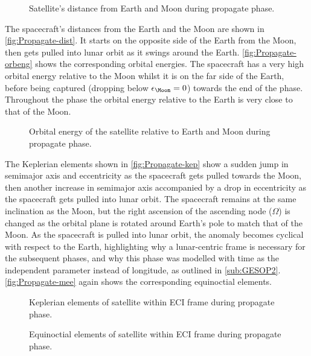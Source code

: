 \begin{figure}
\centering
\def\svgwidth{\figurewidth}

\caption{Satellite's distance from Earth and Moon during propagate phase.} \label{fig:Propagate-dist}
\end{figure}

The spacecraft's distances from the Earth and the Moon are shown in \autoref{fig:Propagate-dist}. It starts on the opposite side of the Earth from the Moon, then gets pulled into lunar orbit as it swings around the Earth. \autoref{fig:Propagate-orbeng} shows the corresponding orbital energies. The spacecraft has a very high orbital energy relative to the Moon whilst it is on the far side of the Earth, before being captured (dropping below $\epsilon_\Moon=0$) towards the end of the phase. Throughout the phase the orbital energy relative to the Earth is very close to that of the Moon.

\begin{figure}
\centering
\def\svgwidth{\figurewidth}

\caption{Orbital energy of the satellite relative to Earth and Moon during propagate phase.} \label{fig:Propagate-orbeng}
\end{figure}

The Keplerian elements shown in \autoref{fig:Propagate-kep} show a sudden jump in semimajor axis and eccentricity as the spacecraft gets pulled towards the Moon, then another increase in semimajor axis accompanied by a drop in eccentricity as the spacecraft gets pulled into lunar orbit. The spacecraft remains at the same inclination as the Moon, but the right ascension of the ascending node ($\Omega$) is changed as the orbital plane is rotated around Earth's pole to match that of the Moon. As the spacecraft is pulled into lunar orbit, the anomaly becomes cyclical with respect to the Earth, highlighting why a lunar-centric frame is necessary for the subsequent phases, and why this phase was modelled with time as the independent parameter instead of longitude, as outlined in \autoref{sub:GESOP2}. \autoref{fig:Propagate-mee} again shows the corresponding equinoctial elements.

\begin{figure}
\centering
\def\svgwidth{0.8\textwidth}

\caption{Keplerian elements of satellite within ECI frame during propagate phase.} \label{fig:Propagate-kep}
\end{figure}

\begin{figure}
\centering
\def\svgwidth{\figurewidth}

\caption{Equinoctial elements of satellite within ECI frame during propagate phase.} \label{fig:Propagate-mee}
\end{figure}

